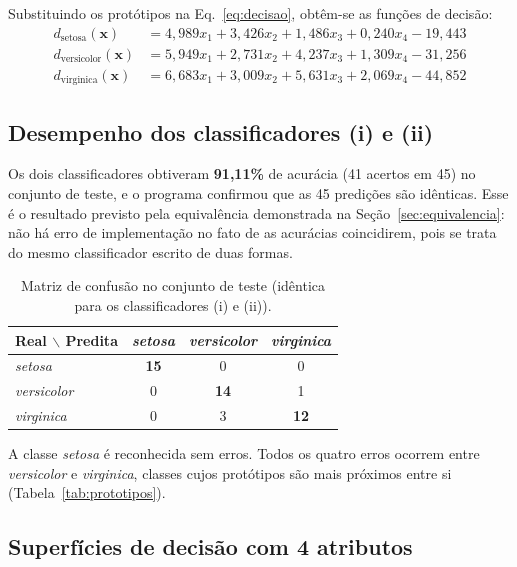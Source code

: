 \documentclass[12pt,a4paper]{article}
\begin{document}
Substituindo os protótipos na Eq.~\eqref{eq:decisao}, obtêm-se as funções de decisão:
\begin{align*}
d_{\text{setosa}}(\mathbf{x})     &= 4{,}989x_1 + 3{,}426x_2 + 1{,}486x_3 + 0{,}240x_4 - 19{,}443\\
d_{\text{versicolor}}(\mathbf{x}) &= 5{,}949x_1 + 2{,}731x_2 + 4{,}237x_3 + 1{,}309x_4 - 31{,}256\\
d_{\text{virginica}}(\mathbf{x})  &= 6{,}683x_1 + 3{,}009x_2 + 5{,}631x_3 + 2{,}069x_4 - 44{,}852
\end{align*}

\subsection{Desempenho dos classificadores (i) e (ii)}

Os dois classificadores obtiveram \textbf{91,11\%} de acurácia (41 acertos em 45) no conjunto de teste, e o programa confirmou que as 45 predições são idênticas. Esse é o resultado previsto pela equivalência demonstrada na Seção~\ref{sec:equivalencia}: não há erro de implementação no fato de as acurácias coincidirem, pois se trata do mesmo classificador escrito de duas formas.

\begin{table}[H]
\centering
\caption{Matriz de confusão no conjunto de teste (idêntica para os classificadores (i) e (ii)).}
\label{tab:confusao}
\begin{tabular}{lccc}
\toprule
Real $\backslash$ Predita & \emph{setosa} & \emph{versicolor} & \emph{virginica} \\
\midrule
\emph{setosa}     & \textbf{15} & 0 & 0 \\
\emph{versicolor} & 0 & \textbf{14} & 1 \\
\emph{virginica}  & 0 & 3 & \textbf{12} \\
\bottomrule
\end{tabular}
\end{table}

A classe \emph{setosa} é reconhecida sem erros. Todos os quatro erros ocorrem entre \emph{versicolor} e \emph{virginica}, classes cujos protótipos são mais próximos entre si (Tabela~\ref{tab:prototipos}).

\subsection{Superfícies de decisão com 4 atributos}\label{sec:hiperplanos}
\end{document}
